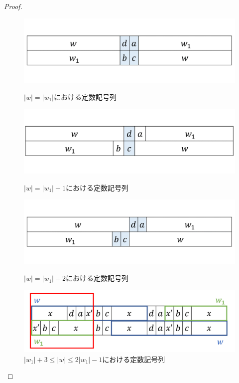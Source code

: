 \begin{proof}
\begin{figure}[t]
  \begin{center}
    \includegraphics[scale=0.35]{figs/w=w_1.png}
    \caption{$|w| = |w_{1}|$における定数記号列}\label{追加部分7}
    \includegraphics[scale=0.35]{figs/w=w_1+1.png}
    \caption{$|w| = |w_{1}|+1$における定数記号列}\label{追加部分8}
    \includegraphics[scale=0.35]{figs/w=w_1+2.png}
    \caption{$|w| = |w_{1}|+2$における定数記号列}\label{追加部分9}
  \end{center}
\end{figure}

\begin{figure}[t]
  \begin{center}
    \includegraphics[scale=0.35]{figs/w1+3.png}
    \caption{$|w_{1}|+3 \le |w| \le 2|w_{1}|-1$における定数記号列}\label{w1+3}
  \end{center}
\end{figure}


\end{proof}
